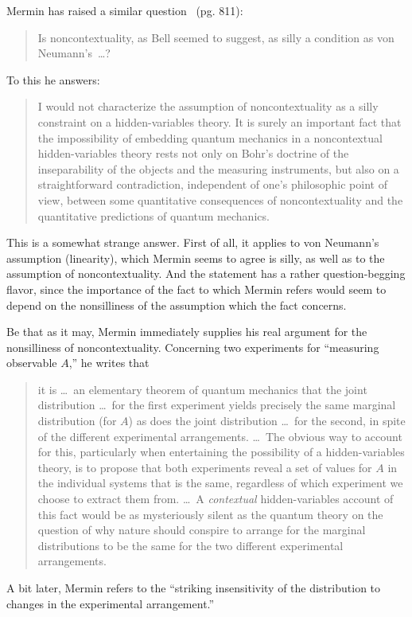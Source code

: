 \documentclass[12pt]{article}
\begin{document}
Mermin has raised a similar question~\cite{merm93} (pg. 811):
\begin{quotation}\setlength{\baselineskip}{12pt}\noindent
   Is noncontextuality, as Bell seemed to suggest, as silly a condition
   as von Neumann's~\dots?
\end{quotation}
To this he answers:
\begin{quotation}\setlength{\baselineskip}{12pt}\noindent
   I would not characterize the assumption of noncontextuality as a
   silly constraint on a hidden-variables theory. It is surely an
   important fact that the impossibility of embedding quantum mechanics
   in a noncontextual hidden-variables theory rests not only on Bohr's
   doctrine of the inseparability of the objects and the measuring
   instruments, but also on a straightforward contradiction,
   independent of one's philosophic point of view, between some
   quantitative consequences of noncontextuality and the quantitative
   predictions of quantum mechanics.
\end{quotation}
This is a somewhat strange answer. First of all, it applies to von
Neumann's assumption (linearity), which Mermin seems to agree is
silly, as well as to the assumption of noncontextuality. And the
statement has a rather question-begging flavor, since the importance
of the fact to which Mermin refers would seem to depend on the
nonsilliness of the assumption which the fact concerns.

Be that as it may, Mermin immediately supplies his real argument for
the nonsilliness of noncontextuality. Concerning two experiments for
``measuring observable $A$,'' he writes that
\begin{quotation}\setlength{\baselineskip}{12pt}\noindent
   it is \dots\ an elementary theorem of quantum mechanics that the
   joint distribution \dots\ for the first experiment yields precisely
   the same marginal distribution (for $A$) as does the joint
   distribution \dots\ for the second, in spite of the different
   experimental arrangements. \dots\ The obvious way to account for
   this, particularly when entertaining the possibility of a
   hidden-variables theory, is to propose that both experiments reveal
   a set of values for $A$ in the individual systems that is the same,
   regardless of which experiment we choose to extract them {}from.
   \dots\ A {\it contextual} hidden-variables account of this fact
   would be as mysteriously silent as the quantum theory on the
   question of why nature should conspire to arrange for the marginal
   distributions to be the same for the two different experimental
   arrangements.
\end{quotation}
A bit later, Mermin refers to the ``striking insensitivity of the
distribution to changes in the experimental arrangement.''
\end{document}
